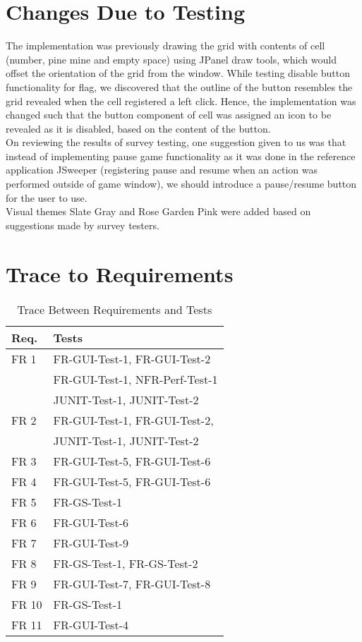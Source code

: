 \documentclass[12pt, titlepage]{article}
\begin{document}
\newpage
\section{Changes Due to Testing}
The implementation was previously drawing the grid with contents of cell (number, pine mine and empty space) using JPanel draw tools,
which would offset the orientation of the grid from the window. While testing disable button functionality for flag, we discovered that the
outline of the button resembles the grid revealed when the cell registered a left click. Hence, the implementation was changed such that
the button component of cell was assigned an icon to be revealed as it is disabled, based on the content of the button.\\

On reviewing the results of survey testing, one suggestion given to us was that instead of implementing pause game functionality as it was done in the reference application JSweeper (registering pause and resume when an action was performed outside of game window), we should introduce a pause/resume button for the user to use.\\

Visual themes Slate Gray and Rose Garden Pink were added based on suggestions made by survey testers.\\

\newpage
\section{Trace to Requirements}

\begin{table}[H]
\centering
\begin{tabular}{p{} p{}}
\toprule
\textbf{Req.} & \textbf{Tests}\\
\midrule
FR 1 & FR-GUI-Test-1, FR-GUI-Test-2\\
	&  FR-GUI-Test-1, NFR-Perf-Test-1\\
	& JUNIT-Test-1, JUNIT-Test-2\\
FR 2 & FR-GUI-Test-1, FR-GUI-Test-2, \\
	& JUNIT-Test-1, JUNIT-Test-2\\
FR 3 & FR-GUI-Test-5, FR-GUI-Test-6\\
FR 4 & FR-GUI-Test-5, FR-GUI-Test-6\\
FR 5 & FR-GS-Test-1\\
FR 6 & FR-GUI-Test-6\\
FR 7 & FR-GUI-Test-9\\
FR 8 & FR-GS-Test-1, FR-GS-Test-2\\
FR 9 & FR-GUI-Test-7, FR-GUI-Test-8\\
FR 10 & FR-GS-Test-1\\
FR 11 & FR-GUI-Test-4\\

\bottomrule
\end{tabular}
\caption{Trace Between Requirements and Tests}
\label{TblRT}
\end{table}
\end{document}
